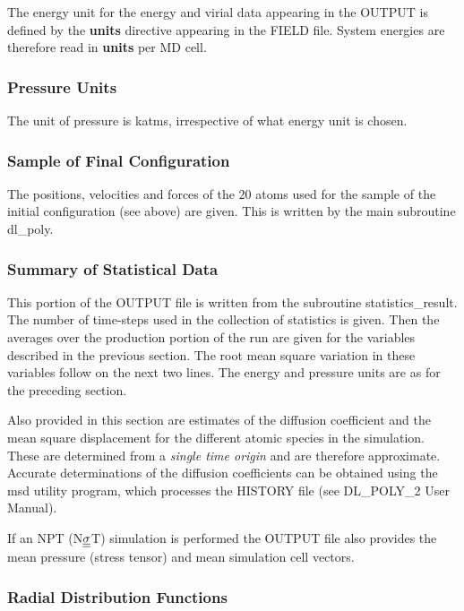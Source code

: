 The energy unit for the energy and virial data appearing in the
OUTPUT is defined by the {\bf units} directive appearing in the
FIELD file.  System energies are therefore read in {\bf units}
per MD cell.

\subsubsection*{Pressure Units}

The unit of pressure is katms, irrespective
of what energy unit is chosen.

\subsubsection{Sample of Final Configuration}

The positions, velocities and forces of the 20 atoms used for the
sample of the initial configuration (see above) are given.  This
is written by the main subroutine {\sc dl\_poly}.

\subsubsection{Summary of Statistical Data}

This portion of the OUTPUT file is written from the subroutine
{\sc statistics\_result}.  The number of time-steps used in the
collection of statistics is given.  Then the averages over the
production portion of the run are given for the variables
described in the previous section.  The root mean square variation
in these variables follow on the next two lines.  The
energy and pressure
units are as for the preceding section.

Also provided in this section are estimates of the diffusion
coefficient and the mean square displacement for the different
atomic species in the simulation.  These are determined from a {\em
single time origin} and are therefore approximate.  Accurate
determinations of the diffusion coefficients can be obtained using
the {\sc msd} utility program, which processes the HISTORY file
(see DL\_POLY\_2 User Manual).

If an NPT (N$\mbox{$\underline{\underline{\bf \sigma}}$}$T) simulation is performed the OUTPUT
file also provides the mean pressure (stress tensor) and mean
simulation cell vectors.

\subsubsection{Radial Distribution Functions}

